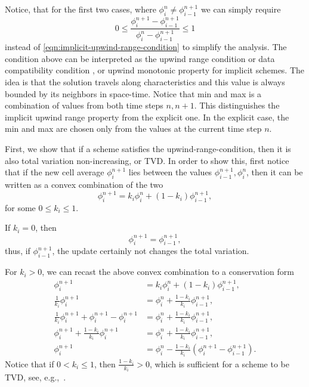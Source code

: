\documentclass[../thesis.tex]{subfiles}
\begin{document}
Notice, that for the first two cases, where \(\phi_{i}^{n} \neq \phi_{i-1}^{n+1}\) we can simply require
\begin{equation}\label{eqn:upwind-range-simpler}
    0
    \leq
    \frac{\phi_{i}^{n+1} - \phi_{i-1}^{n+1}}{\phi_{i}^{n} - \phi_{i-1}^{n+1}}
    \leq
    1
\end{equation}
instead of \eqref{eqn:implicit-upwind-range-condition} to simplify the analysis.
The condition above can be interpreted as the upwind range condition\cite{1998_Laney_BOOK}
or data compatibility condition \cite{2009_Toro_BOOK}, or upwind monotonic property \cite{1989_Huynh_CONF} for implicit schemes.
The idea is that the solution travels along characteristics and this value is always bounded by its neighbors in space-time.
Notice that min and max is a combination of values from both time steps \(n, n+1\).
This distinguishes the implicit upwind range property from the explicit one.
In the explicit case, the min and max are chosen only from the values at the current time step \(n\).

First, we show that if a scheme satisfies the upwind-range-condition, then it is also total variation non-increasing, or TVD.
In order to show this, first notice that if the new cell average \(\phi_{i}^{n+1}\) lies
between the values \(\phi_{i-1}^{n+1}, \phi_{i}^{n}\), then it can be written as a convex combination of the two
\begin{equation}\label{eqn:convex-combination}
    \phi_{i}^{n+1} =
    k_{i}\phi_{i}^{n} + (1-k_{i})\phi_{i-1}^{n+1},
\end{equation}
for some \(0 \leq k_{i} \leq 1\).

If \(k_{i} = 0\), then
\[
    \phi_{i}^{n+1} = \phi_{i-1}^{n+1},
\]
thus, if \(\phi_{i-1}^{n+1}\), the update certainly not changes the total variation.

For \(k_{i} > 0\), we can recast the above convex combination to a conservation form
\begin{equation}\label{eqn:convex-combination-conservative}
    \begin{split}
        \phi_{i}^{n+1}
        &=
        k_{i}\phi_{i}^{n} + (1-k_{i})\phi_{i-1}^{n+1},
        \\
        \frac{1}{k_{i}}\phi_{i}^{n+1}
        &=
        \phi_{i}^{n} + \frac{1-k_{i}}{k_{i}}\phi_{i-1}^{n+1},
        \\
        \frac{1}{k_{i}}\phi_{i}^{n+1} + \phi_{i}^{n+1} - \phi_{i}^{n+1}
        &=
        \phi_{i}^{n} + \frac{1-k_{i}}{k_{i}}\phi_{i-1}^{n+1},
        \\
        \phi_{i}^{n+1} + \frac{1-k_{i}}{k_{i}}\phi_{i}^{n+1}
        &=
        \phi_{i}^{n} + \frac{1-k_{i}}{k_{i}}\phi_{i-1}^{n+1},
        \\
        \phi_{i}^{n+1}
        &=
        \phi_{i}^{n} - \frac{1-k_{i}}{k_{i}}\left( \phi_{i}^{n+1} - \phi_{i-1}^{n+1} \right).
    \end{split}
\end{equation}
Notice that if \(0 < k_{i} \leq 1\), then \( \frac{1-k_{i}}{k_{i}} > 0\), which is sufficient for a scheme to be TVD, see, e.g.,~\cite{2007_Duraisamy,2023_Frolkovic}.
\end{document}
